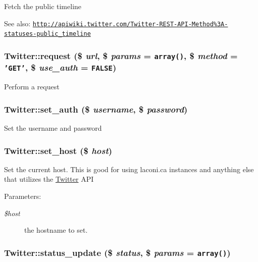 Fetch the public timeline

\begin{Desc}
\item[See also:]\href{http://apiwiki.twitter.com/Twitter-REST-API-Method%3A-statuses-public_timeline}{\tt http://apiwiki.twitter.com/Twitter-REST-API-Method\%3A-statuses-public\_\-timeline} \end{Desc}
\hypertarget{classTwitter_066d888ba8cac684149f69174029d6f5}{
\subsubsection[{request}]{\setlength{\rightskip}{0pt plus 5cm}Twitter::request (\$ {\em url}, \/  \$ {\em params} = {\tt array()}, \/  \$ {\em method} = {\tt 'GET'}, \/  \$ {\em use\_\-auth} = {\tt FALSE})}}
\label{classTwitter_066d888ba8cac684149f69174029d6f5}


Perform a request \hypertarget{classTwitter_1f858ac6fd8c8f3ed4188435ad51957c}{
\subsubsection[{set\_\-auth}]{\setlength{\rightskip}{0pt plus 5cm}Twitter::set\_\-auth (\$ {\em username}, \/  \$ {\em password})}}
\label{classTwitter_1f858ac6fd8c8f3ed4188435ad51957c}


Set the username and password \hypertarget{classTwitter_9a4bb9d8731491784df32c6f864a7cb9}{
\subsubsection[{set\_\-host}]{\setlength{\rightskip}{0pt plus 5cm}Twitter::set\_\-host (\$ {\em host})}}
\label{classTwitter_9a4bb9d8731491784df32c6f864a7cb9}


Set the current host. This is good for using laconi.ca instances and anything else that utilizes the \hyperlink{classTwitter}{Twitter} API

\begin{Desc}
\item[Parameters:]
\begin{description}
\item[{\em \$host}]the hostname to set. \end{description}
\end{Desc}
\hypertarget{classTwitter_6f43168e0afff59d45a1ffc5db30d328}{
\subsubsection[{status\_\-update}]{\setlength{\rightskip}{0pt plus 5cm}Twitter::status\_\-update (\$ {\em status}, \/  \$ {\em params} = {\tt array()})}}
\label{classTwitter_6f43168e0afff59d45a1ffc5db30d328}


